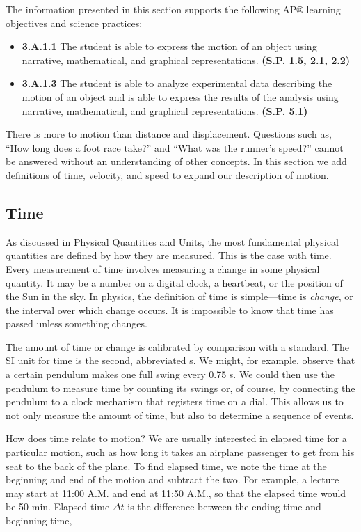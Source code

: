 \documentclass[
]{book}
\providecommand{\tightlist}{%
  \setlength{\itemsep}{0pt}\setlength{\parskip}{0pt}}
\begin{document}
The information presented in this section supports the following AP®
learning objectives and science practices:

\begin{itemize}
\tightlist
\item
  \textbf{3.A.1.1} The student is able to express the motion of an object
  using narrative, mathematical, and graphical representations.
  \textbf{(S.P. 1.5, 2.1, 2.2)}
\item
  \textbf{3.A.1.3} The student is able to analyze experimental data
  describing the motion of an object and is able to express the
  results of the analysis using narrative, mathematical, and graphical
  representations. \textbf{(S.P. 5.1)}
\end{itemize}

There is more to motion than distance and displacement. Questions such
as, ``How long does a foot race take?'' and ``What was the runner's
speed?'' cannot be answered without an understanding of other concepts.
In this section we add definitions of time, velocity, and speed to
expand our description of motion.

\hypertarget{fs-id1568419}{}
\hypertarget{time}{%
\subsection{Time}\label{time}}

As discussed in \href{/m54765}{Physical Quantities and Units}, the most
fundamental physical quantities are defined by how they are measured.
This is the case with time. Every measurement of time involves measuring
a change in some physical quantity. It may be a number on a digital
clock, a heartbeat, or the position of the Sun in the sky. In physics,
the definition of time is simple---\protect\hypertarget{import-auto-id2588516}{}{time} is \emph{change}, or the interval over which change occurs.
It is impossible to know that time has passed unless something changes.

The amount of time or change is calibrated by comparison with a
standard. The SI unit for time is the second, abbreviated s. We might,
for example, observe that a certain pendulum makes one full swing every
0.75 s. We could then use the pendulum to measure time by counting its
swings or, of course, by connecting the pendulum to a clock mechanism
that registers time on a dial. This allows us to not only measure the
amount of time, but also to determine a sequence of events.

How does time relate to motion? We are usually interested in elapsed
time for a particular motion, such as how long it takes an airplane
passenger to get from his seat to the back of the plane. To find elapsed
time, we note the time at the beginning and end of the motion and
subtract the two. For example, a lecture may start at 11:00
\textsc{A.M.} and end at 11:50 \textsc{A.M.}, so that the
elapsed time would be 50 min. \protect\hypertarget{import-auto-id4083152}{}{Elapsed time} \textbf{\({\Delta t}{}\)} is the difference between the
ending time and beginning time,
\end{document}
